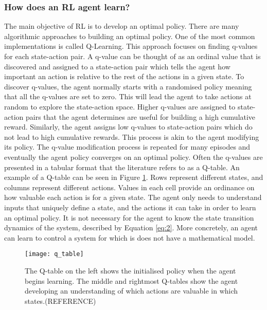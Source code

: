 \subsubsection{How does an RL agent learn?}
The main objective of RL is to develop an optimal policy. There are many algorithmic approaches to building an optimal policy. One of the most common implementations is called Q-Learning. This approach focuses on finding q-values for each state-action pair. A q-value can be thought of as an ordinal value that is discovered and assigned to a state-action pair which tells the agent how important an action is relative to the rest of the actions in a given state. To discover q-values, the agent normally starts with a randomised policy meaning that all the q-values are set to zero. This will lead the agent to take actions at random to explore the state-action space. Higher q-values are assigned to state-action pairs that the agent determines are useful for building a high cumulative reward. Similarly, the agent assigns low q-values to state-action pairs which do not lead to high cumulative rewards. This process is akin to the agent modifying its policy. The q-value modification process is repeated for many episodes and eventually the agent policy converges on an optimal policy. Often the q-values are presented in a tabular format that the literature refers to as a Q-table. An example of a Q-table can be seen in Figure \ref{fig:qtable}. Rows represent different states, and columns represent different actions. Values in each cell provide an ordinance on how valuable each action is for a given state. The agent only needs to understand inputs that uniquely define a state, and the actions it can take in order to learn an optimal policy. It is not necessary for the agent to know the state transition dynamics of the system, described by Equation \ref{eq:2}. More concretely, an agent can learn to control a system for which is does not have a mathematical model.
\begin{figure}[ht]
	\centering
	\texttt{[image: q\_table]}
	\caption{The Q-table on the left shows the initialised policy when the agent begins learning. The middle and rightmost Q-tables show the agent developing an understanding of which actions are valuable in which states.(REFERENCE)}
	\label{fig:qtable}
\end{figure}

